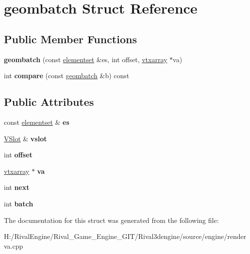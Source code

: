 \hypertarget{structgeombatch}{}\section{geombatch Struct Reference}
\label{structgeombatch}
\subsection*{Public Member Functions}
\begin{DoxyCompactItemize}
\item 
\mbox{\label{structgeombatch_ac75f7955c15112f6632167b4df56b155}} 
{\bfseries geombatch} (const \hyperlink{structelementset}{elementset} \&es, int offset, \hyperlink{structvtxarray}{vtxarray} $\ast$va)
\item 
\mbox{\label{structgeombatch_a2f14476a7aec8444433611fa9f1a87d9}} 
int {\bfseries compare} (const \hyperlink{structgeombatch}{geombatch} \&b) const
\end{DoxyCompactItemize}
\subsection*{Public Attributes}
\begin{DoxyCompactItemize}
\item 
\mbox{\label{structgeombatch_acee6e8d29c3bd980ecd615f757bdb3f2}} 
const \hyperlink{structelementset}{elementset} \& {\bfseries es}
\item 
\mbox{\label{structgeombatch_ad14b264f35d6b77f9285bfb15f398e1c}} 
\hyperlink{struct_v_slot}{V\+Slot} \& {\bfseries vslot}
\item 
\mbox{\label{structgeombatch_abaf812ca1329016141bca1570636fd03}} 
int {\bfseries offset}
\item 
\mbox{\label{structgeombatch_a8645392b8037d035b15dffb249f0225d}} 
\hyperlink{structvtxarray}{vtxarray} $\ast$ {\bfseries va}
\item 
\mbox{\label{structgeombatch_a48d19e83c58bc01f4cb9fd65dc5ba896}} 
int {\bfseries next}
\item 
\mbox{\label{structgeombatch_a4131dcfaa64e3118af144cbf363833aa}} 
int {\bfseries batch}
\end{DoxyCompactItemize}


The documentation for this struct was generated from the following file\+:\begin{DoxyCompactItemize}
\item 
H\+:/\+Rival\+Engine/\+Rival\+\_\+\+Game\+\_\+\+Engine\+\_\+\+G\+I\+T/\+Rival3dengine/source/engine/renderva.\+cpp\end{DoxyCompactItemize}
